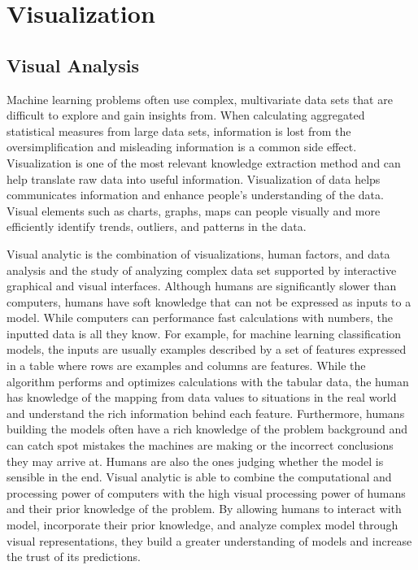 \section{Visualization}
\subsection{Visual Analysis}
\indent Machine learning problems often use complex, multivariate data sets that are difficult to explore and gain insights from. When calculating aggregated statistical measures from large data sets, information is lost from the oversimplification and misleading information is a common side effect. Visualization is one of the most relevant knowledge extraction method and can help translate raw data into useful information. Visualization of data helps communicates information and enhance people’s understanding of the data. Visual elements such as charts, graphs, maps can people visually and more efficiently identify trends, outliers, and patterns in the data. 

\indent Visual analytic is the combination of visualizations, human factors, and data analysis and the study of analyzing complex data set supported by interactive graphical and visual interfaces.
Although humans are significantly slower than computers, humans have soft knowledge that can not be expressed as inputs to a model. While computers can performance fast calculations with numbers, the inputted data is all they know. For example, for machine learning classification models, the inputs are usually examples described by a set of features expressed in a table where rows are examples and columns are features. While the algorithm performs and optimizes calculations with the tabular data, the human has knowledge of the mapping from data values to situations in the real world and understand the rich information behind each feature. Furthermore, humans building the models often have a rich knowledge of the problem background and can catch spot mistakes the machines are making or the incorrect conclusions they may arrive at. Humans are also the ones judging whether the model is sensible in the end. Visual analytic is able to combine the computational and processing power of computers with the high visual processing power of humans and their prior knowledge of the problem. By allowing humans to interact with model, incorporate their prior knowledge, and analyze complex model through visual representations, they build a greater understanding of models and increase the trust of its predictions. 

